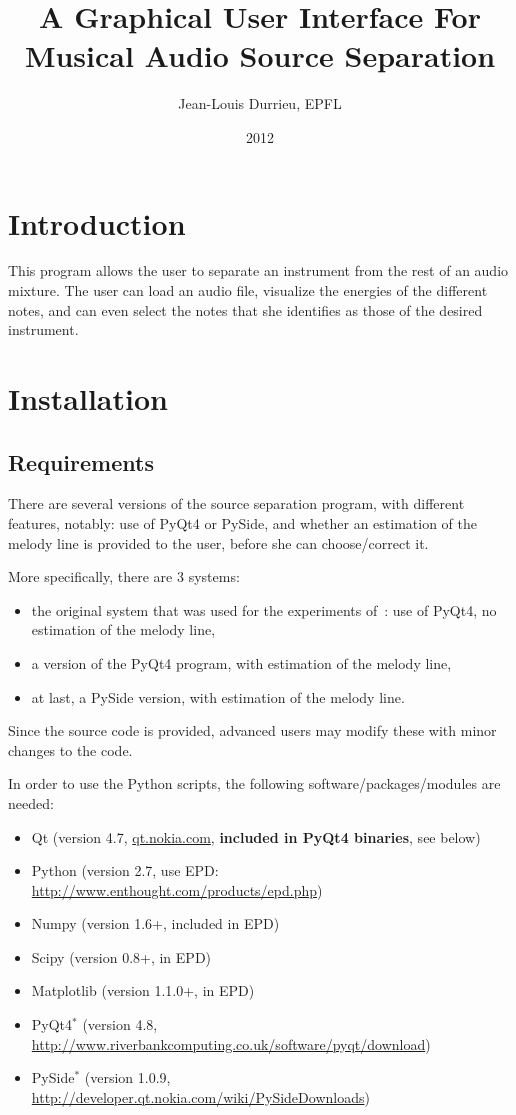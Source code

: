 \documentclass{article}
\title{A Graphical User Interface For Musical Audio Source Separation}
\author{Jean-Louis Durrieu, EPFL}
\date{2012}
\begin{document}
\maketitle

\section{Introduction}

This program allows the user to separate an instrument from the rest of an audio mixture. The user can load an audio file, visualize the energies of the different notes, and can even select the notes that she identifies as those of the desired instrument. 

\section{Installation}

\subsection{Requirements}
There are several versions of the source separation program, with different features, notably: use of PyQt4 or PySide, and whether an estimation of the melody line is provided to the user, before she can choose/correct it.

More specifically, there are 3 systems:
\begin{itemize}
  \item the original system that was used for the experiments of~\cite{Durrieu2012}: use of PyQt4, no estimation of the melody line,
  \item a version of the PyQt4 program, with estimation of the melody line,
  \item at last, a PySide version, with estimation of the melody line. 
\end{itemize}

Since the source code is provided, advanced users may modify these with minor changes to the code. 

In order to use the Python scripts, the following software/packages/modules are needed:

\begin{itemize}
\item Qt            (version 4.7, \url{qt.nokia.com}, \textbf{included in PyQt4 binaries}, see below)
\item Python        (version 2.7, use EPD: \url{http://www.enthought.com/products/epd.php})
\item Numpy         (version 1.6+, included in EPD)
\item Scipy         (version 0.8+, in EPD)
\item Matplotlib    (version 1.1.0+, in EPD)
\item PyQt4$^*$     (version 4.8, \url{http://www.riverbankcomputing.co.uk/software/pyqt/download})
\item PySide$^*$    (version 1.0.9, \url{http://developer.qt.nokia.com/wiki/PySideDownloads})
\end{itemize}
\end{document}
